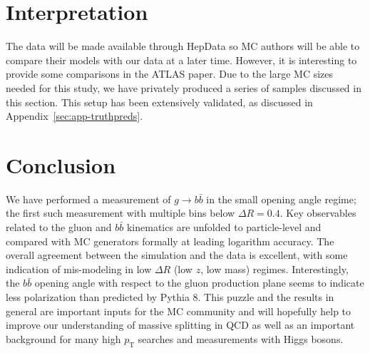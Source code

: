 \documentclass[UKenglish,texlive=2013]{\ATLASLATEXPATH atlasdoc}
\begin{document}
\section{Interpretation}
\label{sec:interp}

The data will be made available through HepData so MC authors will be able to compare their models with our data at a later time.  However, it is interesting to provide some comparisons in the ATLAS paper.  Due to the large MC sizes needed for this study, we have privately produced a series of samples discussed in this section.  This setup has been extensively validated, as discussed in Appendix~\ref{sec:app-truthpreds}.  

\FloatBarrier


\section{Conclusion}
\label{sec:conclusion}

We have performed a measurement of $g\rightarrow b\bar{b}$ in the small opening angle regime; the first such measurement with multiple bins below $\Delta R= 0.4$.  Key observables related to the gluon and $b\bar{b}$ kinematics are unfolded to particle-level and compared with MC generators formally at leading logarithm accuracy.  The overall agreement between the simulation and the data is excellent, with some indication of mis-modeling in low $\Delta R$ (low $z$, low mass) regimes.  Interestingly, the $b\bar{b}$ opening angle with respect to the gluon production plane seems to indicate less polarization than predicted by Pythia 8.  This puzzle and the results in general are important inputs for the MC community and will hopefully help to improve our understanding of massive splitting in QCD as well as an important background for many high $p_\text{T}$ searches and measurements with Higgs bosons.


\end{document}
